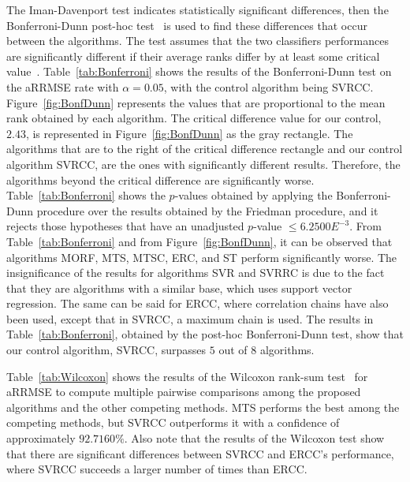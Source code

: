 \documentclass[preprint,12pt]{elsarticle}
\begin{document}
The Iman-Davenport test indicates statistically significant differences, then the Bonferroni-Dunn post-hoc test~\cite{Dunn1961} is used to find these differences that occur between the algorithms. The test assumes that the two classifiers performances are significantly different if their average ranks differ by at least some critical value~\cite{Garcia2009}. Table~\ref{tab:Bonferroni} shows the results of the Bonferroni-Dunn test on the aRRMSE rate with $\alpha = 0.05$, with the control algorithm being SVRCC. Figure~\ref{fig:BonfDunn} represents the values that are proportional to the mean rank obtained by each algorithm.  The critical difference value for our control, $2.43$, is represented in Figure~\ref{fig:BonfDunn} as the gray rectangle. The algorithms that are to the right of the critical difference rectangle and our control algorithm SVRCC, are the ones with significantly different results. Therefore, the algorithms beyond the critical difference are significantly worse. Table~\ref{tab:Bonferroni} shows the $p$-values obtained by applying the Bonferroni-Dunn procedure over the results obtained by the Friedman procedure, and it rejects those hypotheses that have an unadjusted $p$-value $\leq 6.2500E^{-3}$. From Table~\ref{tab:Bonferroni} and from Figure~\ref{fig:BonfDunn}, it can be observed that algorithms MORF, MTS, MTSC, ERC, and ST perform significantly worse. The insignificance of the results for algorithms SVR and SVRRC is due to the fact that they are algorithms with a similar base, which uses support vector regression. The same can be said for ERCC, where correlation chains have also been used, except that in SVRCC, a maximum chain is used. The results in Table~\ref{tab:Bonferroni}, obtained by the post-hoc Bonferroni-Dunn test, show that our control algorithm, SVRCC, surpasses $5$ out of $8$ algorithms. 

Table~\ref{tab:Wilcoxon} shows the results of the Wilcoxon rank-sum test~\cite{Wilcoxon1945} for aRRMSE to compute multiple pairwise comparisons among the proposed algorithms and the other competing methods. MTS performs the best among the competing methods, but SVRCC outperforms it with a confidence of approximately $92.7160\%$. Also note that the results of the Wilcoxon test show that there are significant differences between SVRCC and ERCC's performance, where SVRCC succeeds a larger number of times than ERCC.  
\end{document}

